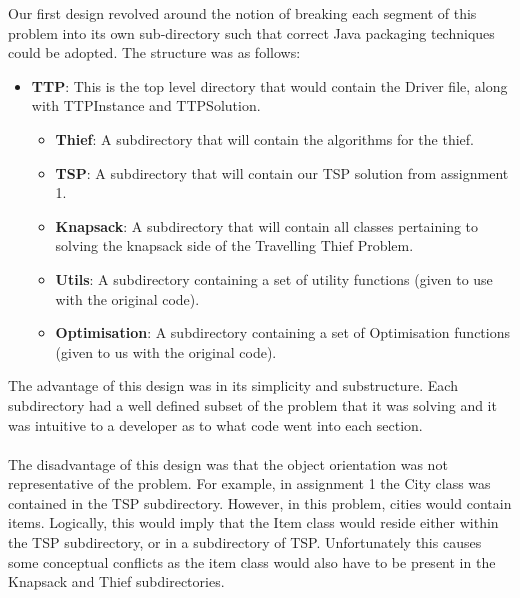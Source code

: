 \documentclass[a4paper,12pt]{article}
\begin{document}
Our first design revolved around the notion of breaking each segment of this problem into its own sub-directory such that correct Java packaging techniques could be adopted. The structure was as follows:
\begin{itemize}
\item \textbf{TTP}: This is the top level directory that would contain the Driver file, along with TTPInstance and TTPSolution.
\begin{itemize}
\item \textbf{Thief}: A subdirectory that will contain the algorithms for the thief.
\item \textbf{TSP}: A subdirectory that will contain our TSP solution from assignment 1.
\item \textbf{Knapsack}: A subdirectory that will contain all classes pertaining to solving the knapsack side of the Travelling Thief Problem.
\item \textbf{Utils}: A subdirectory containing a set of utility functions (given to use with the original code).
\item \textbf{Optimisation}: A subdirectory containing a set of Optimisation functions (given to us with the original code).\\
\end{itemize}

\end{itemize}

The advantage of this design was in its simplicity and substructure. Each subdirectory had a well defined subset of the problem that it was solving and it was intuitive to a developer as to what code went into each section.\\
\\
The disadvantage of this design was that the object orientation was not representative of the problem. For example, in assignment 1 the City class was contained in the TSP subdirectory. However, in this problem, cities would contain items. Logically, this would imply that the Item class would reside either within the TSP subdirectory, or in a subdirectory of TSP. Unfortunately this causes some conceptual conflicts as the item class would also have to be present in the Knapsack and Thief subdirectories.
\end{document}
